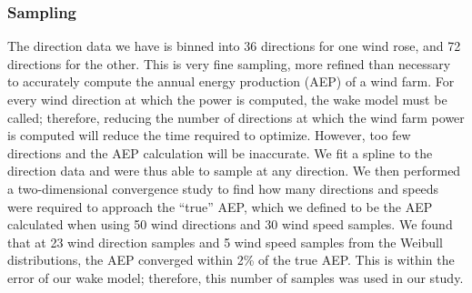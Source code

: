 \documentclass[wes, manuscript]{copernicus}
\begin{document}
\subsubsection{Sampling}
The direction data we have is binned into 36 directions for one wind rose, and 72 directions for the other. This is very fine sampling, 
more refined than necessary to accurately compute the annual energy production (AEP) of a wind farm. 
For every wind direction at which the power is computed, the wake model must be called; therefore, reducing the number of directions at which the wind farm power is computed will reduce the time required to optimize. 
However, too few directions and the AEP calculation will be inaccurate. We fit a spline to the direction data and were thus able to sample at any direction. We then performed a two-dimensional convergence study to find how many directions and speeds were required to approach the ``true'' AEP, which we defined to be the AEP calculated when using 50 wind directions and 30 wind speed samples. 
We found that at 23 wind direction samples and 5 wind speed samples from the Weibull distributions, the AEP converged within 2\% of the true AEP. This is within the error of our wake model; therefore, this number of samples was used in our study. 
\end{document}
